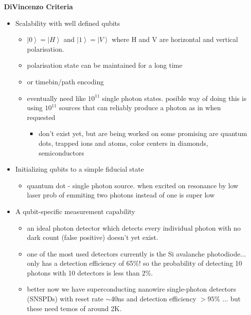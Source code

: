 \vspace{1em}
{\bf DiVincenzo Criteria} \cite{bergou_quantum_2021}
\begin{itemize}
    \item Scalability with well defined qubits
    
    \begin{itemize}
        \item $\left\vert 0 \right\rangle = \left\vert H\right\rangle $ and $\left\vert 1 \right\rangle = \left\vert V\right\rangle $ where H and V are horizontal and vertical polarisation.  
        \item polarisation state can be maintained for a long time
        \item or timebin/path encoding \cite{obrien_optical_2007}

        \item eventually need like $10^{11}$ single photon states. posible way of doing this is using $10^11$ sources that can reliably produce a photon as in when requested
        \begin{itemize}
            \item don't exist yet, but are being worked on some promising are quantum dots, trapped ions and atoms, color centers in diamonds, semiconductors \cite{slussarenko_photonic_2019}
        \end{itemize}
    \end{itemize}

    \item Initializing qubits to a simple fiducial state
    \begin{itemize}
        \item quantum dot - single photon source. when excited on resonance by low laser prob of emmiting two photons instead of one is super low \cite{santori_indistinguishable_2002}
    \end{itemize}

    \item  A qubit-specific measurement capability
    \begin{itemize}
        \item an ideal photon detector which detects every individual photon with no dark count (false positive) doesn't yet exist. 
        \item one of the most used detectors currently is the Si avalanche photodiode... only has a detection efficiency of 65$\%$! so the probability of detecting 10 photons with 10 detectors is less than $2\%$. \cite{slussarenko_photonic_2019}
        \item better now we have superconducting nanowire single-photon detectors (SNSPDs) with reset rate $\sim$40ns and detection efficiency $>95\%$ ... but these need temos of around 2K. \cite{santori_indistinguishable_2002}
        

\end{itemize}
\end{itemize}
